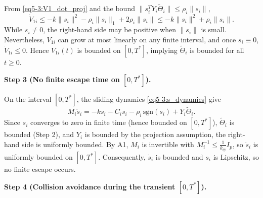 From \eqref{eq5-3:V1_dot_proj} and the bound $\|s_i^T Y_i\tilde{\Theta}_i\| \le \rho_i\|s_i\|$,
\begin{equation}
	\dot{V}_{1i} \le -k\|s_i\|^2 - \rho_i\|s_i\|_1 + 2\rho_i\|s_i\|
	\le -k\|s_i\|^2 + \rho_i\|s_i\|. \label{eq5-3:V1i_bound}
\end{equation}
While $s_i \neq 0$, the right-hand side may be positive when $\|s_i\|$ is small.
Nevertheless, $V_{1i}$ can grow at most linearly on any finite interval, and once $s_i \equiv 0$,
$\dot{V}_{1i} \le 0$.  Hence $V_{1i}(t)$ is bounded on $[0,T^*]$, implying $\tilde{\Theta}_i$ is
bounded for all $t \ge 0$.

\medskip\noindent\textbf{Step 3 (No finite escape time on $[0,T^*]$).}

On the interval $[0,T^*]$, the sliding dynamics \eqref{eq5-3:s_dynamics} give
\begin{equation}
	M_i \dot{s}_i = -k s_i - C_i s_i - \rho_i\,\mathrm{sgn}(s_i) + Y_i\tilde{\Theta}_i.
\end{equation}
Since $s_i$ converges to zero in finite time (hence bounded on $[0,T^*]$), $\tilde{\Theta}_i$ is
bounded (Step 2), and $Y_i$ is bounded by the projection assumption, the right-hand side is
uniformly bounded.  By A1, $M_i$ is invertible with $M_i^{-1} \le \frac{1}{k_{\underline m}} I_p$,
so $\dot{s}_i$ is uniformly bounded on $[0,T^*]$.  Consequently, $\dot{s}_i$ is bounded and
$s_i$ is Lipschitz, so no finite escape occurs.

\medskip\noindent\textbf{Step 4 (Collision avoidance during the transient $[0,T^*]$).}

